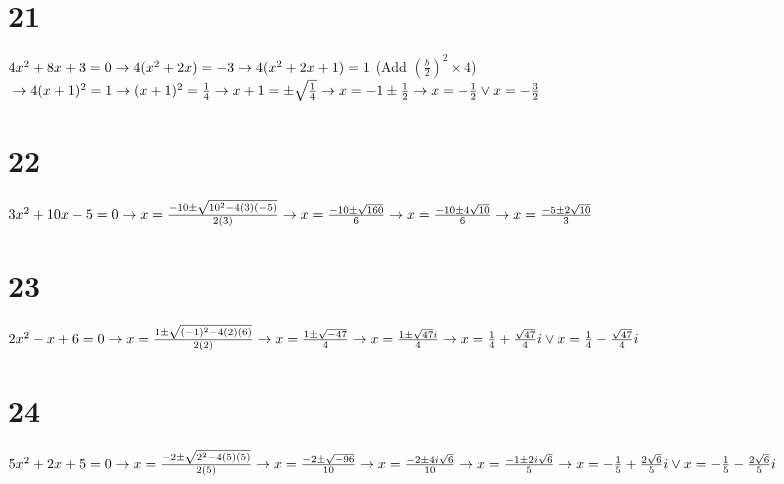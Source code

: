 \documentclass{article}
\theoremstyle{definition}
\begin{document}
\section*{21}
$4x^2+8x+3=0\newline\rightarrow 
4(x^2+2x)=-3\newline\rightarrow 
4(x^2+2x+1)=1$ (Add $(\frac{b}{2})^2\times 4$)
$\newline\rightarrow 4(x+1)^2=1\newline\rightarrow 
(x+1)^2=\frac{1}{4}\newline\rightarrow 
x+1=\pm\sqrt{\frac{1}{4}}\newline\rightarrow 
x=-1\pm\frac{1}{2}\newline\rightarrow 
x=-\frac{1}{2}\vee x=-\frac{3}{2}$

\section*{22}
$3x^2+10x-5=0\newline\rightarrow 
x=\frac{-10\pm\sqrt{10^2-4(3)(-5)}}{2(3)}\newline\rightarrow 
x=\frac{-10\pm\sqrt{160}}{6}\newline\rightarrow 
x=\frac{-10\pm 4\sqrt{10}}{6}\newline\rightarrow 
x=\frac{-5\pm 2\sqrt{10}}{3}$

\section*{23}
$2x^2-x+6=0\newline\rightarrow 
x=\frac{1\pm\sqrt{(-1)^2-4(2)(6)}}{2(2)}\newline\rightarrow 
x=\frac{1\pm\sqrt{-47}}{4}\newline\rightarrow 
x=\frac{1\pm \sqrt{47}i}{4}\newline\rightarrow 
x=\frac{1}{4}+\frac{\sqrt{47}}{4}i\vee x=\frac{1}{4}-\frac{\sqrt{47}}{4}i$

\section*{24}
$5x^2+2x+5=0\newline\rightarrow 
x=\frac{-2\pm\sqrt{2^2-4(5)(5)}}{2(5)}\newline\rightarrow 
x=\frac{-2\pm\sqrt{-96}}{10}\newline\rightarrow 
x=\frac{-2\pm 4i\sqrt{6}}{10}\newline\rightarrow
x=\frac{-1\pm 2i\sqrt{6}}{5}\newline\rightarrow 
x=-\frac{1}{5}+\frac{2\sqrt{6}}{5}i\vee x=-\frac{1}{5}-\frac{2\sqrt{6}}{5}i$
\end{document}
